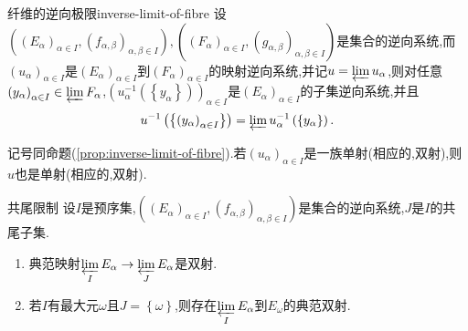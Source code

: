\begin{proposition}{纤维的逆向极限}{inverse-limit-of-fibre}
	设$\left(\left(E_{\alpha}\right)_{\alpha\in I},\left(f_{\alpha,\beta}\right)_{\alpha,\beta\in I}\right),\left(\left(F_{\alpha}\right)_{\alpha\in I},\left(g_{\alpha,\beta}\right)_{\alpha,\beta\in I}\right)$是集合的逆向系统,而$\left(u_{\alpha}\right)_{\alpha\in I}$是$\left(E_{\alpha}\right)_{\alpha\in I}$到$\left(F_{\alpha}\right)_{\alpha\in I}$的映射逆向系统,并记$u=\varprojlim u_{\alpha}$,则对任意$\left(y_{\alpha}\right)_{\alpha\in I}\in\varprojlim F_{\alpha}$,$\left(u_{\alpha}^{-1}\left(\left\{y_{\alpha}\right\}\right)\right)_{\alpha\in I}$是$\left(E_{\alpha}\right)_{\alpha\in I}$的子集逆向系统,并且
	\begin{align*}
		u^{-1}\left(\left\{\left(y_{\alpha}\right)_{\alpha\in I}\right\}\right)=\varprojlim u_{\alpha}^{-1}\left(\left\{y_{\alpha}\right\}\right).
	\end{align*}
\end{proposition}

\begin{corollary}{}{}
	记号同命题(\cref{prop:inverse-limit-of-fibre}).若$\left(u_{\alpha}\right)_{\alpha\in I}$是一族单射(相应的,双射),则$u$也是单射(相应的,双射).
\end{corollary}

\begin{proposition}{共尾限制}{}
	设$I$是预序集,$\left(\left(E_{\alpha}\right)_{\alpha\in I},\left(f_{\alpha,\beta}\right)_{\alpha,\beta\in I}\right)$是集合的逆向系统,$J$是$I$的共尾子集.
	\begin{enumerate}
		\item 典范映射$\varprojlim\limits_{I}E_{\alpha}\to\varprojlim\limits_{J}E_{\alpha}$是双射.
		\item 若$I$有最大元$\omega$且$J=\left\{\omega\right\}$,则存在$\varprojlim\limits_{I}E_{\alpha}$到$E_{\omega}$的典范双射.
	\end{enumerate}
\end{proposition}

